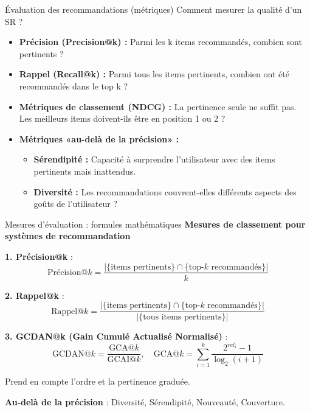 \documentclass[9pt, aspectratio=169]{beamer}
\begin{document}
\begin{frame}{Évaluation des recommandations (métriques)}
    Comment mesurer la qualité d'un SR ?
    \begin{itemize}
        \item \textbf{Précision (Precision@k) :} Parmi les k items recommandés, combien sont pertinents ?
        \item \textbf{Rappel (Recall@k) :} Parmi tous les items pertinents, combien ont été recommandés dans le top k ?
        \item \textbf{Métriques de classement (NDCG) :} La pertinence seule ne suffit pas. Les meilleurs items doivent-ils être en position 1 ou 2 ?
        \item \textbf{Métriques «au-delà de la précision» :}
            \begin{itemize}
                \item \textbf{Sérendipité :} Capacité à surprendre l'utilisateur avec des items pertinents mais inattendus.
                \item \textbf{Diversité :} Les recommandations couvrent-elles différents aspects des goûts de l'utilisateur ?
            \end{itemize}
    \end{itemize}
\end{frame}

\begin{frame}{Mesures d'évaluation : formules mathématiques}
    \textbf{Mesures de classement pour systèmes de recommandation}
    
    \vspace{0.3cm}
    \textbf{1. Précision@k} :
    \[
    \text{Précision@}k = \frac{|\{\text{items pertinents}\} \cap \{\text{top-}k\text{ recommandés}\}|}{k}
    \]
    
    \textbf{2. Rappel@k} :
    \[
    \text{Rappel@}k = \frac{|\{\text{items pertinents}\} \cap \{\text{top-}k\text{ recommandés}\}|}{|\{\text{tous items pertinents}\}|}
    \]
    
    \textbf{3. GCDAN@k (Gain Cumulé Actualisé Normalisé)} :
    \[
    \text{GCDAN@}k = \frac{\text{GCA@}k}{\text{GCAI@}k}, \quad \text{GCA@}k = \sum_{i=1}^{k} \frac{2^{rel_i} - 1}{\log_2(i+1)}
    \]
    
    Prend en compte l'ordre et la pertinence graduée.
    
    \vspace{0.2cm}
    \textbf{Au-delà de la précision} : Diversité, Sérendipité, Nouveauté, Couverture.
\end{frame}
\end{document}
